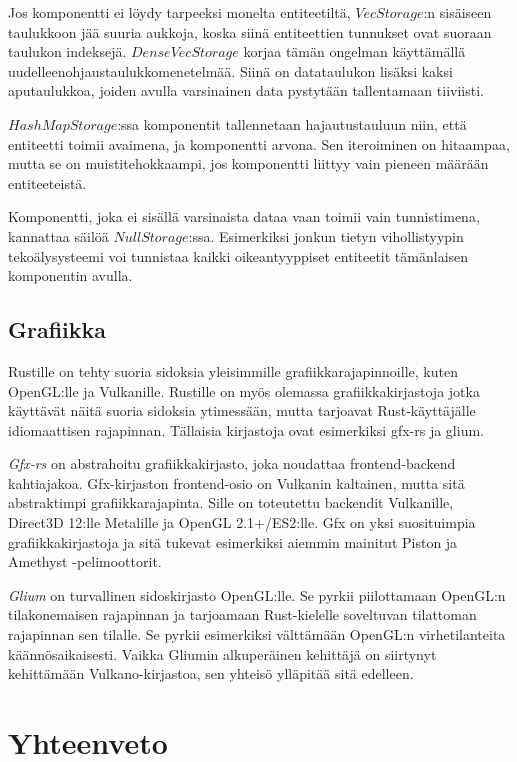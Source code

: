 \documentclass[finnish]{tktltiki2}
\theoremstyle{definition}
\theoremstyle{remark}
\begin{document}
Jos komponentti ei löydy tarpeeksi monelta entiteetiltä, $VecStorage$:n sisäiseen taulukkoon jää suuria aukkoja, koska siinä entiteettien tunnukset ovat suoraan taulukon indeksejä. $DenseVecStorage$ korjaa tämän ongelman käyttämällä uudelleenohjaustaulukkomenetelmää. Siinä on datataulukon lisäksi kaksi aputaulukkoa, joiden avulla varsinainen data pystytään tallentamaan tiiviisti.

$HashMapStorage$:ssa komponentit tallennetaan hajautustauluun niin, että entiteetti toimii avaimena, ja komponentti arvona. Sen iteroiminen on hitaampaa, mutta se on muistitehokkaampi, jos komponentti liittyy vain pieneen määrään entiteeteistä.  

Komponentti, joka ei sisällä varsinaista dataa vaan toimii vain tunnistimena, kannattaa säilöä $NullStorage$:ssa. Esimerkiksi jonkun tietyn vihollistyypin tekoälysysteemi voi tunnistaa kaikki oikeantyyppiset entiteetit tämänlaisen komponentin avulla. 

\subsection{Grafiikka}

Rustille on tehty suoria sidoksia yleisimmille grafiikkarajapinnoille, kuten OpenGL:lle ja Vulkanille. Rustille on myös olemassa grafiikkakirjastoja jotka käyttävät näitä suoria sidoksia ytimessään, mutta tarjoavat Rust-käyttäjälle idiomaattisen rajapinnan. Tällaisia kirjastoja ovat esimerkiksi gfx-rs ja glium.

\textit{Gfx-rs} on abstrahoitu grafiikkakirjasto, joka noudattaa frontend-backend kahtiajakoa. Gfx-kirjaston frontend-osio on Vulkanin kaltainen, mutta sitä abstraktimpi grafiikkarajapinta. Sille on toteutettu backendit Vulkanille, Direct3D 12:lle Metalille ja OpenGL 2.1+/ES2:lle. Gfx on yksi suosituimpia grafiikkakirjastoja ja sitä tukevat esimerkiksi aiemmin mainitut Piston ja Amethyst -pelimoottorit.

\textit{Glium} on turvallinen sidoskirjasto OpenGL:lle. Se pyrkii piilottamaan OpenGL:n tilakonemaisen rajapinnan ja tarjoamaan Rust-kielelle soveltuvan tilattoman rajapinnan sen tilalle. Se pyrkii esimerkiksi välttämään OpenGL:n virhetilanteita käännösaikaisesti. Vaikka Gliumin alkuperäinen kehittäjä on siirtynyt kehittämään Vulkano-kirjastoa, sen yhteisö ylläpitää sitä edelleen.

\section{Yhteenveto}
\end{document}
